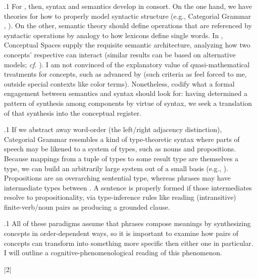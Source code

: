 \documentclass[11pt, twocolumn]{article}
\begin{document}
\p.1{%
\:\+For \Boltetal{}, then, syntax and semantics develop in consort. \>  On the
one hand, we have theories for how to properly model syntactic
structure (e.g., Categorial Grammar , ). \>  On the other, semantic theory
should define operations that are referenced by syntactic operations
by analogy to how lexicons define single words. \>  In , Conceptual Spaces
supply the requisite semantic architecture, analyzing how
two concepts' respective  can interact (similar
results can be based on alternative 
models; \textit{cf.} ). \> 
I am not convinced of the explanatory value of
quasi-mathematical treatments for concepts, such as
advanced by \Gardenfors{} (such criteria as 
feel forced to me, outside special contexts like color terms). \> 
Nonetheless, \Boltetal{} codify what a formal engagement
between semantics and syntax should look for: having determined
a pattern of synthesis among components by
virtue of syntax, we seek a translation of that
synthesis into the conceptual register.\<\;
}%

\p.1{%
\:\+If we abstract away word-order (the left/right adjacency distinction),
Categorial Grammar resembles a kind of type-theoretic syntax
where parts of speech may be likened to a system of types,
such as nouns and propositions. \>  Because mappings from a tuple
of types to some result type are themselves a type,
we can build an arbitrarily large system
out of a small basis (e.g., \nslashp{}). \> 
Propositions are an overarching sentential type,
whereas phrases may have intermediate types between
\pANDn{}. \>  A sentence is properly
formed if those intermediates resolve to propositionality,
via type-inference rules like reading (intransitive)
finite-verb/noun
pairs as producing a grounded clause.\<\;
}%

\p.1{%
\:\+All of these paradigms assume that phrases compose
meanings by synthesizing concepts in order-dependent
ways, so it is important to examine how pairs of
concepts can transform into something more specific
then either one in particular. \>  I will outline a
cognitive-phenomenological reading of this phenomenon.\vspace{6pt}\;
}%


\s|2|{}
\end{document}
